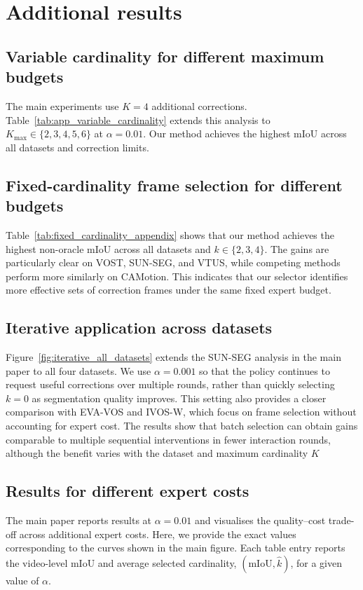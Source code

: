 \section{Additional results}

\subsection{Variable cardinality for different maximum budgets}
The main experiments use \(K=4\) additional corrections. Table~\ref{tab:app_variable_cardinality} extends this analysis to
\(K_{\max}\in\{2,3,4,5,6\}\) at \(\alpha=0.01\). Our method achieves
the highest mIoU across all datasets and correction limits.

\subsection{Fixed-cardinality frame selection for different budgets}

Table~\ref{tab:fixed_cardinality_appendix} shows that our method achieves the
highest non-oracle mIoU across all datasets and
\(k\in\{2,3,4\}\). The gains are particularly clear on VOST, SUN-SEG,
and VTUS, while competing methods perform more similarly on CAMotion.
This indicates that our selector identifies more effective sets of
correction frames under the same fixed expert budget.

\subsection{Iterative application across datasets}
Figure~\ref{fig:iterative_all_datasets} extends the SUN-SEG analysis in
the main paper to all four datasets. We use \(\alpha=0.001\) so that the
policy continues to request useful corrections over multiple rounds,
rather than quickly selecting \(k=0\) as segmentation quality improves.
This setting also provides a closer comparison with EVA-VOS and IVOS-W,
which focus on frame selection without accounting for expert cost. The results show that batch selection can obtain gains
comparable to multiple sequential interventions in fewer interaction
rounds, although the benefit varies with the dataset and maximum
cardinality \(K\)

\subsection{Results for different expert costs}

The main paper reports results at \(\alpha=0.01\) and visualises the
quality--cost trade-off across additional expert costs.  Here, we
provide the exact values corresponding to the curves shown in the main
figure. Each table entry reports the video-level mIoU and average
selected cardinality, \((\mathrm{mIoU}, \widehat{k})\), for
a given value of \(\alpha\).

